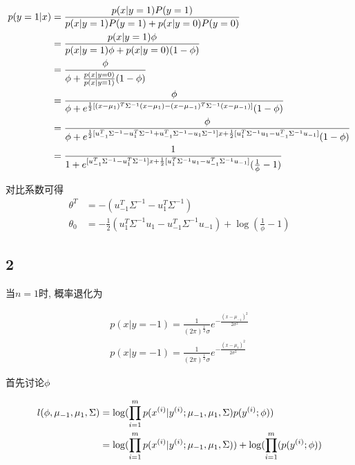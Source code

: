 \documentclass{ctexart}
\begin{document}
\begin{align}
	p(y = 1|x) &= \frac{p(x|y = 1)P(y = 1)}{p(x|y = 1)P(y = 1) + p(x|y = 0)P(y = 0)} \notag \\
	&=  \frac{p(x|y = 1)\phi}{p(x|y = 1)\phi + p(x|y = 0)(1 - \phi)} \notag \\
	&=  \frac{\phi}{\phi + \frac{p(x|y = 0)}{p(x|y = 1)}(1 - \phi)} \notag \\
	&=  \frac{\phi}{\phi + e^{\frac{1}{2}[(x-\mu_1)^T\Sigma^{-1}(x-\mu_1)-(x-\mu_{-1})^T\Sigma^{-1}(x-\mu_{-1})]}(1 - \phi)} \notag \\
	&= \frac{\phi}{\phi + e^{\frac{1}{2}[u_{-1}^T\Sigma^{-1}-u_1^T\Sigma^{-1} + u_{-1}^T \Sigma^{-1} - u_1 \Sigma^{-1}]x + \frac{1}{2}[u_1^T\Sigma^{-1}u_1 - u_{-1}^T\Sigma^{-1}u_{-1}]}(1 - \phi)} \notag \\
	&= \frac{1}{1 + e^{[u_{-1}^T\Sigma^{-1}-u_1^T\Sigma^{-1}]x + \frac{1}{2}[u_1^T\Sigma^{-1}u_1 - u_{-1}^T\Sigma^{-1}u_{-1}]}(\frac{1}{\phi} - 1)} \notag \\
\end{align}

对比系数可得
\begin{align}
	\theta^T &= -(u_{-1}^T\Sigma^{-1}-u_1^T\Sigma^{-1}) \\
	\theta_0 &= -\frac{1}{2}(u_1^T\Sigma^{-1}u_1 - u_{-1}^T\Sigma^{-1}u_{-1}) + \log(\frac{1}{\phi} - 1)
\end{align}

\subsection{2}

当$n=1$时, 概率退化为

\begin{align}
	p(x|y= -1) = \frac{1}{(2\pi)^{\frac{1}{2}}\sigma}e^{-\frac{(x-\mu_{-1})^2}{2\sigma^2}} \\
	p(x|y= -1) = \frac{1}{(2\pi)^{\frac{1}{2}}\sigma}e^{-\frac{(x-\mu_{1})^2}{2\sigma^2}}	
\end{align}

首先讨论$\phi$

\begin{align}
	l(\phi,\mu_{-1},\mu_1,\Sigma) &= \log(\prod_{i=1}^m p(x^{(i)}|y^{(i)};\mu_{-1},\mu_1,\Sigma)p(y^{(i)};\phi)) \notag \\
	&= \log(\prod_{i=1}^m p(x^{(i)}|y^{(i)};\mu_{-1},\mu_1,\Sigma)) + \log(\prod_{i=1}^m(p(y^{(i)};\phi)) \notag \\
\end{align}
\end{document}
